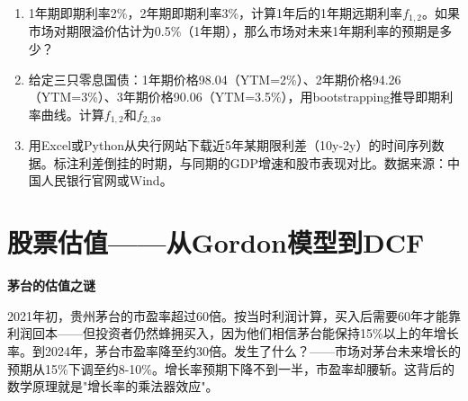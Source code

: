 \documentclass[a4paper,11pt]{ctexbook}
\begin{document}
{\begin{exercises}
\begin{enumerate}
  \item 1年期即期利率2\%，2年期即期利率3\%，计算1年后的1年期远期利率$f_{1,2}$。如果市场对期限溢价估计为0.5\%（1年期），那么市场对未来1年期利率的预期是多少？
  \item 给定三只零息国债：1年期价格98.04（YTM=2\%）、2年期价格94.26（YTM=3\%）、3年期价格90.06（YTM=3.5\%），用bootstrapping推导即期利率曲线。计算$f_{1,2}$和$f_{2,3}$。
  \item 用Excel或Python从央行网站下载近5年某期限利差（10y-2y）的时间序列数据。标注利差倒挂的时期，与同期的GDP增速和股市表现对比。数据来源：中国人民银行官网或Wind。
\end{enumerate}
\end{exercises}


\newpage
\chapter{股票估值——从Gordon模型到DCF}

\begin{scenario}
\textbf{茅台的估值之谜}

2021年初，贵州茅台的市盈率超过60倍。按当时利润计算，买入后需要60年才能靠利润回本——但投资者仍然蜂拥买入，因为他们相信茅台能保持15\%以上的年增长率。到2024年，茅台市盈率降至约30倍。发生了什么？——市场对茅台未来增长的预期从15\%下调至约8-10\%。增长率预期下降不到一半，市盈率却腰斩。这背后的数学原理就是"增长率的乘法器效应"。
\end{scenario}

}
\end{document}
